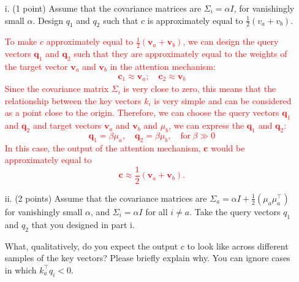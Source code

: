 \documentclass[letterpaper,12pt]{article}
\begin{document}
	\begin{itemize}
	\item[i.] 
		(1 point) Assume that the covariance matrices are $\Sigma_i = \alpha I$, for vanishingly small $\alpha$. Design $q_1$
		and $q_2$ such that $c$ is approximately equal to $\frac{1}{2}(v_a + v_b)$.
		
		\textcolor{red}{ To make $c$ approximately equal to $ \frac {1}{2} (\mathbf{v}_a + \mathbf{v}_b) $, we can design the query vectors $\mathbf{q}_1$ and $\mathbf{q}_2$ such that they are approximately equal to the weights of the target vector $\mathbf{v}_a$ and $\mathbf{v}_b$ in the attention mechanism:
		\begin{equation*}
			\begin{aligned}
				\mathbf{c}_1 \approx \mathbf{v}_a; \quad \mathbf{c}_2 \approx \mathbf{v}_b
			\end{aligned}
		\end{equation*}
		Since the covariance matrix $ \Sigma_i $ is very close to zero, this means that the relationship between the key vectors $k_i$ is very simple and can be considered as a point close to the origin. Therefore, we can choose the query vectors $\mathbf{q}_1$ and $\mathbf{q}_2$ and target vectors $\mathbf{v}_a$ and $\mathbf{v}_b$ and $\mu_b$, we can express the $\mathbf{q}_1$ and $\mathbf{q}_2$:
		\begin{equation*}
			\mathbf{q}_1 = \beta \mu_a, \quad \mathbf{q}_2 = \beta \mu_b, \quad \text{for} \ \beta \gg 0
		\end{equation*}
		In this case, the output of the attention mechanism, $\mathbf{c}$ would be approximately equal to 
		\begin{equation*}
			\mathbf{c} \approx \frac{1}{2} (\mathbf{v}_a + \mathbf{v}_b).
		\end{equation*}
		}
	
	\item[ii.] 
		(2 points) Assume that the covariance matrices are $\Sigma_a = \alpha I + \frac{1}{2}(\mu_a \mu_a^\top)$ for vanishingly small $\alpha$, and $\Sigma_i = \alpha I$ for all $i \neq a$. Take the query vectors $q_1$ and $q_2$ that you designed in part i.
		
		What, qualitatively, do you expect the output $c$ to look like across different samples of the key
		vectors? Please briefly explain why. You can ignore cases in which $k^\top_a q_i < 0$.
		

\end{itemize}
\end{document}
